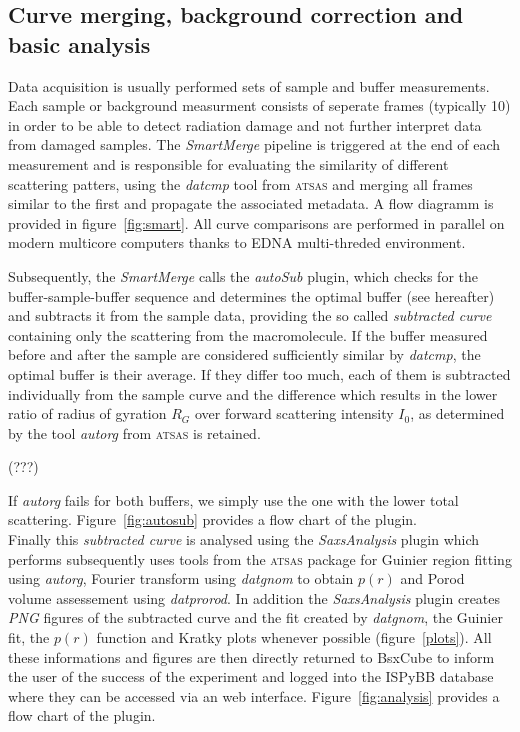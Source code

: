 \documentclass[preprint,pdf]{iucr}              %
\begin{document}
\subsection{Curve merging, background correction and basic analysis}
Data acquisition is usually performed sets of sample and buffer measurements.
Each sample or background measurment consists of seperate frames (typically 10)
in order to be able to detect radiation damage and not further interpret data from damaged samples.
The \textit{SmartMerge} pipeline is triggered at the end of each measurement
and is responsible for evaluating the similarity of different scattering
patters, using the \textit{datcmp} tool from \textsc{atsas} and merging all frames
similar to the first and propagate the associated metadata.
A flow diagramm is provided in figure~\ref{fig:smart}.
All curve comparisons are performed in parallel on modern multicore
computers thanks to EDNA multi-threded environment.

Subsequently, the \textit{SmartMerge} calls the \textit{autoSub} plugin, which
checks for the buffer-sample-buffer sequence and determines the optimal buffer
(see hereafter) and subtracts it from the sample data,  providing the so called
\textit{subtracted curve} containing only the scattering from the macromolecule.
If the buffer measured before and after the sample are considered sufficiently
similar by \textit{datcmp}, the optimal buffer is their average.
If they differ too much, each of them is subtracted individually from the
sample curve and the difference which results in the lower ratio of radius
of gyration $R_{G}$ over forward scattering intensity $I_{0}$, as determined by
the tool \textit{autorg} from \textsc{atsas} is retained.

(???)

If \textit{autorg} fails for both buffers, we simply use the one with the lower
total scattering. Figure~\ref{fig:autosub} provides a flow chart of the plugin.\\

Finally this \textit{subtracted curve} is analysed using the
\textit{SaxsAnalysis} plugin which performs subsequently uses tools from the \textsc{atsas} package for Guinier region fitting
using \textit{autorg}, Fourier transform using \textit{datgnom} to obtain
$p(r)$ and Porod volume assessement using \textit{datprorod}.
In addition the \textit{SaxsAnalysis} plugin creates \textit{PNG} figures of
the subtracted curve and the fit created by \textit{datgnom}, the Guinier fit, the $p(r)$ function and Kratky plots whenever possible (figure~\ref{plots}).
All these informations and figures are then directly returned to BsxCube to inform the user
of the success of the experiment and logged into the ISPyBB
database \cite{ispybb} where they can be accessed via an web interface.
Figure~\ref{fig:analysis} provides a flow chart of the plugin.
\end{document}
